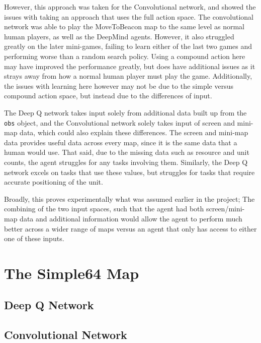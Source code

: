 However, this approach was taken for the Convolutional network, and showed the
issues with taking an approach that uses the full action space. The
convolutional network was able to play the MoveToBeacon map to the same level as
normal human players, as well as the DeepMind agents. However, it also struggled
greatly on the later mini-games, failing to learn either of the last two games
and performing worse than a random search policy. Using a compound action here
may have improved the performance greatly, but does have additional issues as it
strays away from how a normal human player must play the game.  Additionally,
the issues with learning here however may not be due to the simple versus
compound action space, but instead due to the differences of input.

The Deep Q network takes input solely from additional data built up from the
\texttt{obs} object, and the Convolutional network solely takes input of screen
and mini-map data, which could also explain these differences. The screen and
mini-map data provides useful data across every map, since it is the same data
that a human would use. That said, due to the missing data such as resource and
unit counts, the agent struggles for any tasks involving them.  Similarly, the
Deep Q network excels on tasks that use these values, but struggles for tasks
that require accurate positioning of the unit.

Broadly, this proves experimentally what was assumed earlier in the project;
The combining of the two input spaces, such that the agent had both
screen/mini-map data and additional information would allow the agent to perform
much better across a wider range of maps versus an agent that only has access to
either one of these inputs.

\section{The Simple64 Map}

\subsection{Deep Q Network}

\subsection{Convolutional Network}

